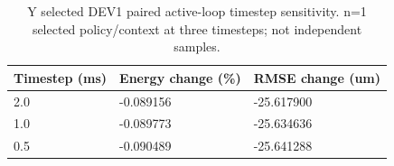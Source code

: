 \begin{table}[t]
\centering\small
\caption{Y selected DEV1 paired active-loop timestep sensitivity. n=1 selected policy/context at three timesteps; not independent samples.}
\label{tab:numerical}
\begin{tabular}{lll}
\hline
Timestep (ms) & Energy change (\%) & RMSE change (um) \\
\hline
2.0 & -0.089156 & -25.617900 \\
1.0 & -0.089773 & -25.634636 \\
0.5 & -0.090489 & -25.641288 \\
\hline
\end{tabular}
\end{table}
